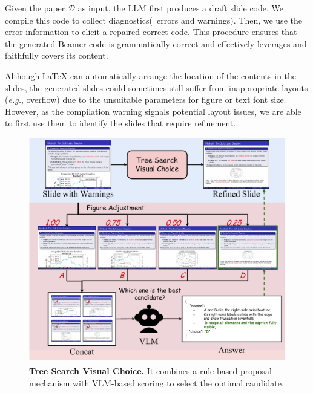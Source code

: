 Given the paper $\mathcal{D}$ as input, the LLM first produces a draft slide code. We compile this code to collect diagnostics(\ie~errors and warnings). Then, we use the error information to elicit a repaired correct code.
This procedure ensures that the generated Beamer code is grammatically correct and effectively leverages and faithfully covers its content.

Although \LaTeX{} can automatically arrange the location of the contents in the slides, the generated slides could sometimes still suffer from inappropriate layouts (\textit{e.g.}, overflow) due to the unsuitable parameters for figure or text font size. However, as the compilation warning signals potential layout issues, we are able to first use them to identify the slides that require refinement.
\begin{figure} %
  \centering
  \includegraphics[width=\linewidth]{figure/tree_search.pdf}
  \captionsetup{skip=2pt}                 %
  \caption{\textbf{Tree Search Visual Choice.} It combines a rule-based proposal mechanism with VLM-based scoring to select the optimal candidate.}
  \label{fig:mcts}
\end{figure}

